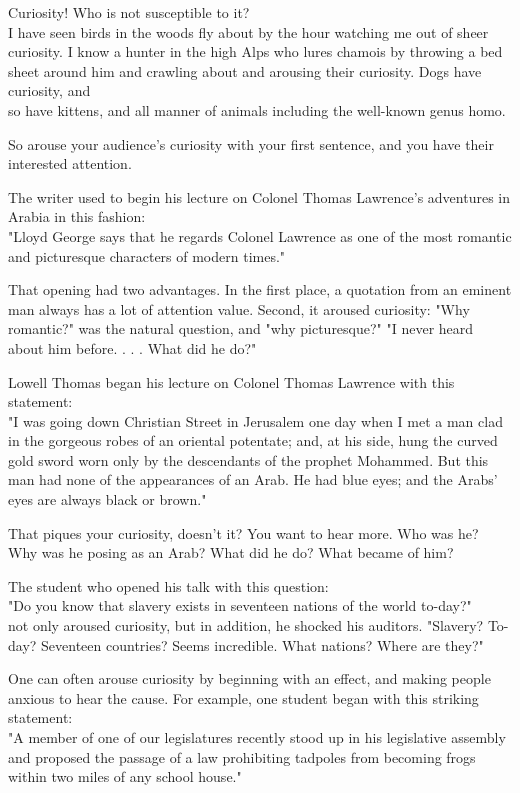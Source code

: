 \documentclass[10pt]{article}
\begin{document}
Curiosity! Who is not susceptible to it?\\
I have seen birds in the woods fly about by the hour watching me out of sheer curiosity. I know a hunter in the high Alps who lures chamois by throwing a bed sheet around him and crawling about and arousing their curiosity. Dogs have curiosity, and\\
so have kittens, and all manner of animals including the well-known genus homo.

So arouse your audience's curiosity with your first sentence, and you have their interested attention.

The writer used to begin his lecture on Colonel Thomas Lawrence's adventures in Arabia in this fashion:\\
"Lloyd George says that he regards Colonel Lawrence as one of the most romantic and picturesque characters of modern times."

That opening had two advantages. In the first place, a quotation from an eminent man always has a lot of attention value. Second, it aroused curiosity: "Why romantic?" was the natural question, and "why picturesque?" "I never heard about him before. . . . What did he do?"

Lowell Thomas began his lecture on Colonel Thomas Lawrence with this statement:\\
"I was going down Christian Street in Jerusalem one day when I met a man clad in the gorgeous robes of an oriental potentate; and, at his side, hung the curved gold sword worn only by the descendants of the prophet Mohammed. But this man had none of the appearances of an Arab. He had blue eyes; and the Arabs' eyes are always black or brown."

That piques your curiosity, doesn't it? You want to hear more. Who was he? Why was he posing as an Arab? What did he do? What became of him?

The student who opened his talk with this question:\\
"Do you know that slavery exists in seventeen nations of the world to-day?"\\
not only aroused curiosity, but in addition, he shocked his auditors. "Slavery? To-day? Seventeen countries? Seems incredible. What nations? Where are they?"

One can often arouse curiosity by beginning with an effect, and making people anxious to hear the cause. For example, one student began with this striking statement:\\
"A member of one of our legislatures recently stood up in his legislative assembly and proposed the passage of a law prohibiting tadpoles from becoming frogs within two miles of any school house."
\end{document}
